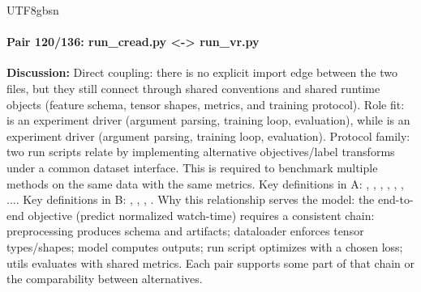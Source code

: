 \documentclass[11pt]{article}
\begin{document}
\begin{CJK*}{UTF8}{gbsn}
\paragraph{Pair 120/136: run\_cread.py <-> run\_vr.py}
\textbf{Discussion:} Direct coupling: there is no explicit import edge between the two files, but they still connect through shared conventions and shared runtime objects (feature schema, tensor shapes, metrics, and training protocol). Role fit: \texttt{} is an experiment driver (argument parsing, training loop, evaluation), while \texttt{} is an experiment driver (argument parsing, training loop, evaluation). Protocol family: two run scripts relate by implementing alternative objectives/label transforms under a common dataset interface. This is required to benchmark multiple methods on the same data with the same metrics. Key definitions in A: \texttt{}, \texttt{}, \texttt{}, \texttt{}, \texttt{}, \texttt{}, .... Key definitions in B: \texttt{}, \texttt{}, \texttt{}, \texttt{}. Why this relationship serves the model: the end-to-end objective (predict normalized watch-time) requires a consistent chain: preprocessing produces schema and artifacts; dataloader enforces tensor types/shapes; model computes outputs; run script optimizes with a chosen loss; utils evaluates with shared metrics. Each pair supports some part of that chain or the comparability between alternatives.


\end{CJK*}
\end{document}
